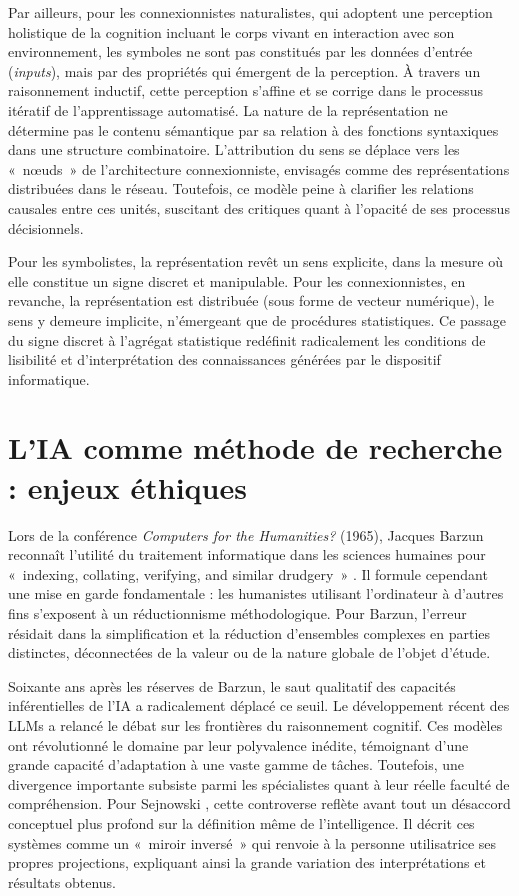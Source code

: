 \documentclass[fra, final]{anthology-ch}
\begin{document}
Par ailleurs, pour les connexionnistes naturalistes, qui adoptent une perception holistique de la cognition incluant le corps vivant en interaction avec son environnement, les symboles ne sont pas constitués par les données d'entrée (\textit{inputs}), mais par des propriétés qui émergent de la perception. À travers un raisonnement inductif, cette perception s’affine et se corrige dans le processus itératif de l’apprentissage automatisé. La nature de la représentation ne détermine pas le contenu sémantique par sa relation à des fonctions syntaxiques dans une structure combinatoire. L'attribution du sens se déplace vers les «~nœuds~» de l'architecture connexionniste, envisagés comme des représentations distribuées dans le réseau. Toutefois, ce modèle peine à clarifier les relations causales entre ces unités, suscitant des critiques \cite{fodor1988, russell2009} quant à l'opacité de ses processus décisionnels.

Pour les symbolistes, la représentation revêt un sens explicite, dans la mesure où elle constitue un signe discret et manipulable. Pour les connexionnistes, en revanche, la représentation est distribuée (sous forme de vecteur numérique), le sens y demeure implicite, n’émergeant que de procédures statistiques. Ce passage du signe discret à l'agrégat statistique redéfinit radicalement les conditions de lisibilité et d'interprétation des connaissances générées par le dispositif informatique.

\section{L'IA comme méthode de recherche : enjeux éthiques }

Lors de la conférence \textit{Computers for the Humanities?} (1965), Jacques Barzun reconnaît l’utilité du traitement informatique dans les sciences humaines pour «~indexing, collating, verifying, and similar drudgery~» \cite{leed1966}. Il formule cependant une mise en garde fondamentale : les humanistes utilisant l’ordinateur à d'autres fins s'exposent à un réductionnisme méthodologique. Pour Barzun, l'erreur résidait dans la simplification et la réduction d'ensembles complexes en parties distinctes, déconnectées de la valeur ou de la nature globale de l’objet d’étude.

Soixante ans après les réserves de Barzun, le saut qualitatif des capacités inférentielles de l’IA a radicalement déplacé ce seuil. Le développement récent des LLMs a relancé le débat sur les frontières du raisonnement cognitif. Ces modèles ont révolutionné le domaine par leur polyvalence inédite, témoignant d'une grande capacité d'adaptation à une vaste gamme de tâches. Toutefois, une divergence importante subsiste parmi les spécialistes quant à leur réelle faculté de compréhension. Pour Sejnowski \cite{sejnowski2023}, cette controverse reflète avant tout un désaccord conceptuel plus profond sur la définition même de l'intelligence. Il décrit ces systèmes comme un «~miroir inversé~»  qui renvoie à la personne utilisatrice ses propres projections,  expliquant ainsi la grande variation des interprétations et résultats obtenus.
\end{document}
